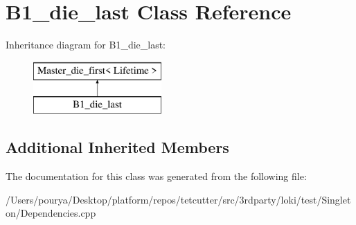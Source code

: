 \hypertarget{classB1__die__last}{}\section{B1\+\_\+die\+\_\+last Class Reference}
\label{classB1__die__last}
Inheritance diagram for B1\+\_\+die\+\_\+last\+:\begin{figure}[H]
\begin{center}
\leavevmode
\includegraphics[height=2.000000cm]{classB1__die__last}
\end{center}
\end{figure}
\subsection*{Additional Inherited Members}


The documentation for this class was generated from the following file\+:\begin{DoxyCompactItemize}
\item 
/\+Users/pourya/\+Desktop/platform/repos/tetcutter/src/3rdparty/loki/test/\+Singleton/Dependencies.\+cpp\end{DoxyCompactItemize}
